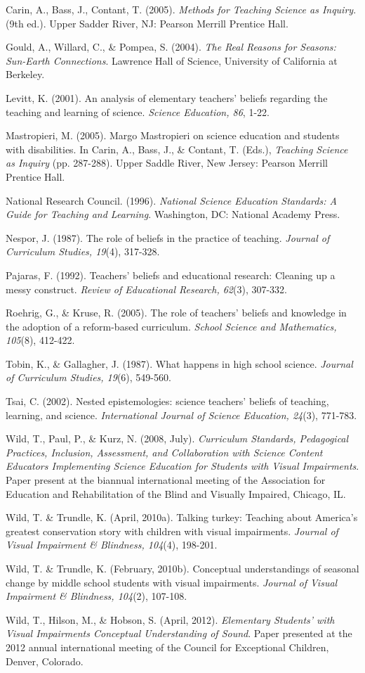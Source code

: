 \documentclass[11.5pt]{sig-alternate} %
\begin{document}
Carin, A., Bass, J., Contant, T.  (2005).  \textit{Methods for Teaching Science as Inquiry}.  (9th ed.).  Upper Sadder River, NJ: Pearson Merrill Prentice Hall.

Gould, A., Willard, C., \& Pompea, S.  (2004).  \textit{The Real Reasons for Seasons: Sun-Earth Connections}.  Lawrence Hall of Science, University of California at Berkeley.

Levitt, K.  (2001).  An analysis of elementary teachers’ beliefs regarding the teaching and learning of science.  \textit{Science Education, 86}, 1-22.

Mastropieri, M. (2005).  Margo Mastropieri on science education and students with disabilities.  In Carin, A., Bass, J., \& Contant, T.  (Eds.), \textit{Teaching Science as Inquiry} (pp. 287-288).  Upper Saddle River, New Jersey: Pearson Merrill Prentice Hall.

National Research Council.  (1996).  \textit{National Science Education Standards: A Guide for Teaching and Learning}.  Washington, DC: National Academy Press.

Nespor, J.  (1987).  The role of beliefs in the practice of teaching.  \textit{Journal of Curriculum Studies, 19}(4), 317-328.

Pajaras, F.  (1992).  Teachers’ beliefs and educational research: Cleaning up a messy construct. \textit{Review of Educational Research, 62}(3), 307-332.

Roehrig, G., \& Kruse, R.  (2005).  The role of teachers’ beliefs and knowledge in the 	adoption of a reform-based curriculum. \textit{School Science and Mathematics, 105}(8), 412-422.

Tobin, K., \& Gallagher, J.  (1987).  What happens in high school science.  \textit{Journal of 	Curriculum Studies, 19}(6), 549-560.

Tsai, C.  (2002).  Nested epistemologies: science teachers’ beliefs of teaching, learning, 	and science. \textit{ International Journal of Science Education, 24}(3), 771-783.

Wild, T., Paul, P., \& Kurz, N. (2008, July).  \textit{Curriculum Standards, Pedagogical Practices, Inclusion, Assessment, and Collaboration with Science Content Educators Implementing Science Education for Students with Visual Impairments}.  Paper present at the biannual international meeting of the Association for 	Education and Rehabilitation of the Blind and Visually Impaired, Chicago, IL.

Wild, T. \& Trundle, K. (April, 2010a).  Talking turkey: Teaching about America’s greatest conservation story with children with visual impairments.  \textit{Journal of Visual Impairment \& Blindness, 104}(4), 198-201.

Wild, T.  \& Trundle, K. (February, 2010b).  Conceptual understandings of seasonal change by middle school students with visual impairments. \textit{Journal of Visual Impairment \& Blindness, 104}(2), 107-108.

Wild, T., Hilson, M., \& Hobson, S.  (April, 2012).  \textit{Elementary Students’ with Visual Impairments Conceptual Understanding of Sound}.  Paper presented at the 2012 annual international meeting of the Council for Exceptional Children, Denver, Colorado.
\end{document}
